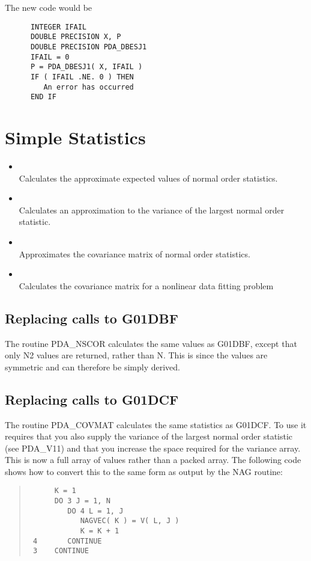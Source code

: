    The new code would be

\begin{verbatim}
      INTEGER IFAIL
      DOUBLE PRECISION X, P
      DOUBLE PRECISION PDA_DBESJ1
      IFAIL = 0
      P = PDA_DBESJ1( X, IFAIL )
      IF ( IFAIL .NE. 0 ) THEN
         An error has occurred
      END IF
\end{verbatim}

\section{Simple Statistics}
\begin{itemize}
   \item {} \\
         Calculates the approximate expected values of normal order statistics.
   \item {} \\
         Calculates an approximation to the variance of the largest
         normal order statistic.
   \item {} \\
         Approximates the covariance matrix of normal order statistics.
   \item {} \\
    Calculates the covariance matrix for a nonlinear data fitting problem
\end{itemize}

\subsection{Replacing calls to G01DBF}
The routine PDA\_NSCOR calculates the same values as G01DBF, except
that only N2 values are returned, rather than N. This is since the
values are symmetric and can therefore be simply derived.

\subsection{Replacing calls to G01DCF}
The routine PDA\_COVMAT calculates the same statistics as G01DCF. To
use it requires that you also supply the variance of the largest
normal order statistic (see PDA\_V11) and that you increase the space
required for the variance array. This is now a full array of values
rather than a packed array. The following code shows how to convert 
this to the same form as output by the NAG routine:
\begin{quote}
\begin{verbatim}
      K = 1
      DO 3 J = 1, N
         DO 4 L = 1, J
            NAGVEC( K ) = V( L, J )
            K = K + 1
 4       CONTINUE
 3    CONTINUE
\end{verbatim}
\end{quote}

